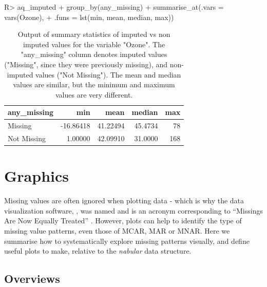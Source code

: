 \documentclass[
]{jss}
\begin{document}
\begin{CodeChunk}
\begin{CodeInput}
R> aq_imputed %
+   group_by(any_missing) %
+   summarise_at(.vars = vars(Ozone),
+                .funs = lst(min, mean, median, max)) 
\end{CodeInput}
\end{CodeChunk}

\begin{CodeChunk}
\begin{table}

\caption{\label{tab:impute-summary-out}Output of  summary statistics of imputed vs non imputed values for the variable "Ozone". The "any\_missing" column denotes imputed values ("Missing", since they were previously missing), and non-imputed values ("Not Missing"). The mean and median values are similar, but the minimum and maximum values are very different.}
\centering
\begin{tabular}[t]{l|r|r|r|r}
\hline
any\_missing & min & mean & median & max\\
\hline
Missing & -16.86418 & 41.22494 & 45.4734 & 78\\
\hline
Not Missing & 1.00000 & 42.09910 & 31.0000 & 168\\
\hline
\end{tabular}
\end{table}

\end{CodeChunk}

\hypertarget{graphics}{%
\section{Graphics}\label{graphics}}

Missing values are often ignored when plotting data - which is why the data visualization software, , was named and is an acronym corresponding to ``Missings Are Now Equally Treated'' \citep{Unwin1996}. However, plots can help to identify the type of missing value patterns, even those of MCAR, MAR or MNAR. Here we summarise how to systematically explore missing patterns visually, and define useful plots to make, relative to the \emph{nabular} data structure.

\hypertarget{overviews}{%
\subsection{Overviews}\label{overviews}}
\end{document}
